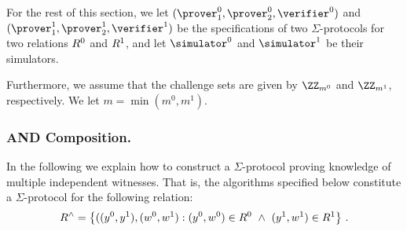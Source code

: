 \documentclass[runningheads]{llncs}
\begin{document}
  For the rest of this section, we let $(\prover_1^0,\prover_2^0,\verifier^0)$ and $(\prover_1^1,\prover_2^1,\verifier^1)$ be the specifications of two $\Sigma$-protocols for two relations $R^0$ and $R^1$, and let $\simulator^0$ and $\simulator^1$ be their simulators.

  Furthermore, we assume that the challenge sets are given by $\ZZ_{m^0}$ and $\ZZ_{m^1}$, respectively.
  We let $m=\min(m^0,m^1)$.


\subsubsection{AND Composition.}
  In the following we explain how to construct a $\Sigma$-protocol proving knowledge of multiple independent witnesses.
  That is, the algorithms specified below constitute a $\Sigma$-protocol for the following relation:
$$
  R^\land = \left\{ ((y^0,y^1),(w^0,w^1) : (y^0,w^0)\in R^0 ~\land~ (y^1,w^1)\in R^1\right\}\,.
$$
\end{document}
